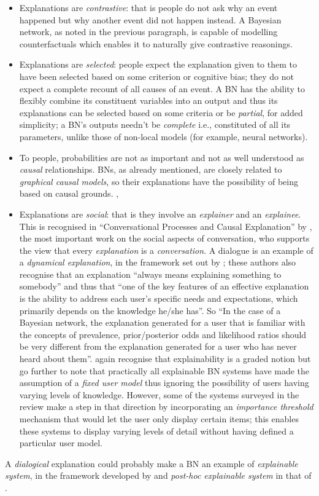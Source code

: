 \begin{itemize}
  \item Explanations are \textit{contrastive}: that is people do not ask why an event happened but why another event did not happen instead.  
  A Bayesian network, as noted in the previous paragraph, is capable of modelling counterfactuals which enables it to naturally give contrastive reasonings.
  \item Explanations are \textit{selected}: people expect the explanation given to them to have been selected based on some criterion or cognitive bias; they do not expect a complete recount of all causes of an event.
  A BN has the ability to flexibly combine its constituent variables into an output and thus its explanations can be selected based on some criteria or be \textit{partial}, for added simplicity; a BN's outputs needn't be \textit{complete} i.e., constituted of all its parameters, unlike those of non-local models (for example, neural networks).
  \item To people, probabilities are not as important and not as well understood as \textit{causal} relationships.
  BNs, as already mentioned, are closely related to \textit{graphical causal models}, so their explanations have the possibility of being based on causal grounds. \citep{Lipton2016}, \citet{rani2006empirical}
  \item Explanations are \textit{social}: that is they involve an \textit{explainer} and an \textit{explainee}.  
  This is recognised in \enquote{Conversational Processes and Causal Explanation} by \citet{Hilton1990}, the most important work on the social aspects of conversation, who supports the view that every \textit{explanation} is a \textit{conversation}. 
  A dialogue is an example of a \textit{dynamical explanation}, in the framework set out by \citet{lacave2002review}; these authors also recognise that an explanation \enquote{always means explaining something to somebody} and thus that \enquote{one of the key features of an effective explanation is the ability to address each user's specific needs and expectations, which primarily depends on the knowledge he/she has}.
  	  So \enquote{In the case of a Bayesian network, the explanation generated for a user that is familiar with the concepts of prevalence, prior/posterior odds and likelihood ratios should be very different from the explanation generated for a user who has never heard about them}.
  	  \citet{lacave2002review} again recognise that explainability is a graded notion but go further to note that practically all explainable BN systems have made the assumption of a \textit{fixed user model} thus ignoring the possibility of users having varying levels of knowledge.
  	  However, some of the systems surveyed in the review make a step in that direction by incorporating an \textit{importance threshold} mechanism that would let the user only display certain items; this enables these systems to display varying levels of detail without having defined a particular user model.
\end{itemize}
A \textit{dialogical} explanation could probably make a BN an example of \textit{explainable system}, in the framework developed by \citet{Doran2018} and \textit{post-hoc explainable system} in that of \citet{mittelstadt2019explaining}.


